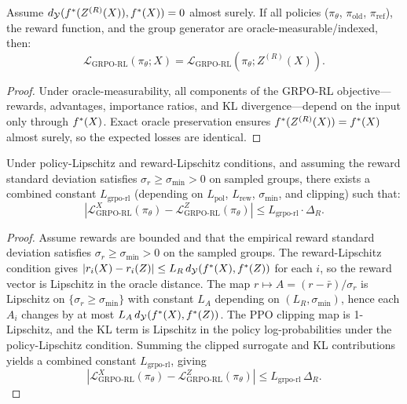 \begin{theorem}\label{thm:grpo-rl-exact}
Assume $d_{\mathcal{Y}}(f^{\ast}(Z^{(R)}(X)), f^{\ast}(X)) = 0$ almost surely. If all policies ($\pi_\theta$, $\pi_{\text{old}}$, $\pi_{\text{ref}}$), the reward function, and the group generator are oracle-measurable/indexed, then:
\[
\mathcal{L}_{\text{GRPO-RL}}(\pi_\theta; X) = \mathcal{L}_{\text{GRPO-RL}}(\pi_\theta; Z^{(R)}(X)).
\]
\end{theorem}

\begin{proof}
Under oracle-measurability, all components of the GRPO-RL objective---rewards, advantages, importance ratios, and KL divergence---depend on the input only through $f^{\ast}(X)$. Exact oracle preservation ensures $f^{\ast}(Z^{(R)}(X)) = f^{\ast}(X)$ almost surely, so the expected losses are identical.
\end{proof}

\begin{theorem}\label{thm:grpo-rl-gap}
Under policy-Lipschitz and reward-Lipschitz conditions, and assuming the reward standard deviation satisfies $\sigma_r \ge \sigma_{\min} > 0$ on sampled groups, there exists a combined constant $L_{\text{grpo-rl}}$ (depending on $L_{\text{pol}}$, $L_{\text{rew}}$, $\sigma_{\min}$, and clipping) such that:
\[
|\mathcal{L}_{\text{GRPO-RL}}^X(\pi_\theta) - \mathcal{L}_{\text{GRPO-RL}}^Z(\pi_\theta)| \le L_{\text{grpo-rl}} \cdot \Delta_R.
\]
\end{theorem}

\begin{proof}
Assume rewards are bounded and that the empirical reward standard deviation satisfies $\sigma_r\ge\sigma_{\min}>0$ on the sampled groups. The reward-Lipschitz condition gives
$|r_i(X)-r_i(Z)|\le L_R\,d_{\mathcal{Y}}(f^{\ast}(X),f^{\ast}(Z))$ for each $i$, so the reward vector is Lipschitz in the oracle distance. The map $r\mapsto A=(r-\bar r)/\sigma_r$ is Lipschitz on $\{\sigma_r\ge\sigma_{\min}\}$ with constant $L_A$ depending on $(L_R,\sigma_{\min})$, hence each $A_i$ changes by at most $L_A\,d_{\mathcal{Y}}(f^{\ast}(X),f^{\ast}(Z))$. The PPO clipping map is 1-Lipschitz, and the KL term is Lipschitz in the policy log-probabilities under the policy-Lipschitz condition. Summing the clipped surrogate and KL contributions yields a combined constant $L_{\text{grpo-rl}}$, giving
\[
|\mathcal{L}_{\text{GRPO-RL}}^X(\pi_\theta)-\mathcal{L}_{\text{GRPO-RL}}^Z(\pi_\theta)|\le L_{\text{grpo-rl}}\,\Delta_R.
\]
\end{proof}

